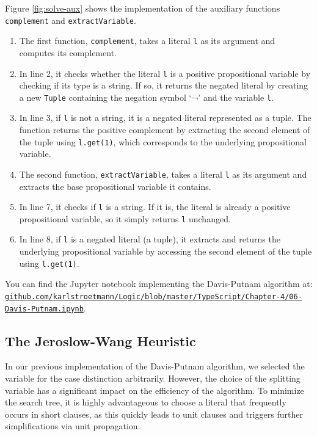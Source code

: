 Figure \ref{fig:solve-aux} shows the implementation of the auxiliary functions \texttt{complement} and
\texttt{extractVariable}.
\begin{enumerate}
\item The first function, \texttt{complement}, takes a literal \texttt{l} as its argument and computes its complement.
\item In line 2, it checks whether the literal \texttt{l} is a positive propositional variable by checking if
  its type is a string. If so, it returns the negated literal by creating a new \texttt{Tuple} containing the
  negation symbol `¬' and the variable \texttt{l}. 
\item In line 3, if \texttt{l} is not a string, it is a negated literal represented as a tuple. The function
  returns the positive complement by extracting the second element of the tuple using \texttt{l.get(1)}, which
  corresponds to the underlying propositional variable. 
\item The second function, \texttt{extractVariable}, takes a literal \texttt{l} as its argument and extracts
  the base propositional variable it contains. 
\item In line 7, it checks if \texttt{l} is a string. If it is, the literal is already a positive propositional
  variable, so it simply returns \texttt{l} unchanged. 
\item In line 8, if \texttt{l} is a negated literal (a tuple), it extracts and returns the underlying
  propositional variable by accessing the second element of the tuple using \texttt{l.get(1)}. 
\end{enumerate}
You can find the Jupyter notebook implementing the Davis-Putnam algorithm at:
\\[0.2cm]
\hspace*{-0.1cm}
\href{https://github.com/karlstroetmann/Logic/blob/master/TypeScript/Chapter-4/06-Davis-Putnam.ipynb}{\texttt{github.com/karlstroetmann/Logic/blob/master/TypeScript/Chapter-4/06-Davis-Putnam.ipynb}}.


\subsection{The Jeroslow-Wang Heuristic}
In our previous implementation of the Davis-Putnam algorithm, we selected the variable for the case distinction
arbitrarily. However, the choice of the splitting variable has a significant impact on the efficiency of the
algorithm. To minimize the search tree, it is highly advantageous to choose a literal that frequently occurs in
short clauses, as this quickly leads to unit clauses and triggers further simplifications via unit propagation. 
 

